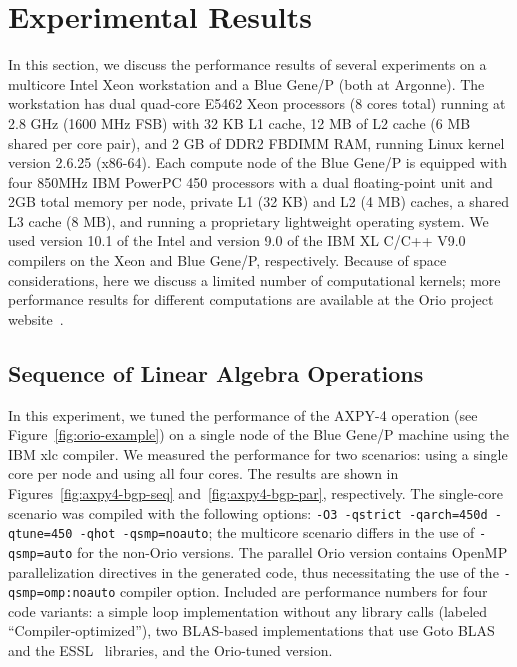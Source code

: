 \section{Experimental Results} 
\label{sec:results} 
 
In this section, we discuss the performance results of several experiments on
a multicore Intel Xeon workstation and a Blue Gene/P (both at Argonne). The
workstation has dual quad-core E5462 Xeon processors (8 cores total) running
at 2.8 GHz (1600 MHz FSB) with 32 KB L1 cache, 12 MB of L2 cache (6 MB shared
per core pair), and 2 GB of DDR2 FBDIMM RAM, running Linux kernel version
2.6.25 (x86-64). Each compute node of the Blue Gene/P is equipped with four
850MHz IBM PowerPC 450 processors with a dual floating-point unit and 2GB
total memory per node, private L1 (32 KB) and L2 (4 MB) caches, a shared L3
cache (8 MB), and running a proprietary lightweight operating system. We used
version 10.1 of the Intel and version 9.0 of the IBM XL C/C++ V9.0 compilers
on the Xeon and Blue Gene/P, respectively. Because of space considerations,
here we discuss a limited number of computational kernels; more performance
results for different computations are available at the Orio project
website~\cite{OrioURL}.

\subsection{Sequence of Linear Algebra Operations} 
\label{sec:axpy4-results}
 
In this experiment, we tuned the performance of the AXPY-4 operation (see
Figure~\ref{fig:orio-example}) on a single node of the Blue Gene/P machine
using the IBM xlc compiler.  We measured the performance for two scenarios:
using a single core per node and using all four cores. The results are shown
in Figures~\ref{fig:axpy4-bgp-seq} and~\ref{fig:axpy4-bgp-par},
respectively. The single-core scenario was compiled with the following options:
\texttt{-O3 -qstrict -qarch=450d -qtune=450 -qhot -qsmp=noauto};  the
multicore scenario differs in the use of \texttt{-qsmp=auto} for the non-Orio
versions. The parallel Orio version contains OpenMP parallelization
directives in the generated code, thus necessitating the use of the
\texttt{-qsmp=omp:noauto} compiler option. Included are performance numbers for four
code variants: a simple loop implementation without any library calls
(labeled ``Compiler-optimized''), two BLAS-based implementations that use
Goto BLAS~\cite{Goto:2006fk} and the ESSL~\cite{ESSL} libraries, and the
Orio-tuned version.

